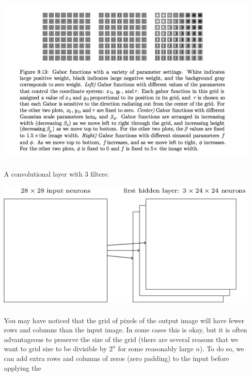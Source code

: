 \documentclass[xetex,mathserif,serif,aspectratio=169]{beamer}
\begin{document}
\begin{frame}[fragile] \frametitle{} \oldB \small

\begin{center}
\includegraphics[height=0.8\textheight]{img/gabor.jpg}
\end{center}

\end{frame}

\begin{frame}[fragile] \frametitle{} \oldB \small

A convolutional layer with $3$ filters:

\begin{center}
\includegraphics[height=0.7\textheight]{img/tikz46.png}
\end{center}

\end{frame}

\begin{frame}[fragile] \frametitle{} \oldB \small

\textbf{}

You may have noticed that the grid of pixels of the output image
will have fewer rows and columns than the input image.
In some cases this is okay, but it is often advantageous to
preserve the size of the grid (there are several reasons that we
want to grid size to be divisible by $2^n$ for some reasonably large
$n$). To do so, we can add extra rows and columns of zeros
(zero padding) to the input before applying the

\end{frame}
\end{document}
